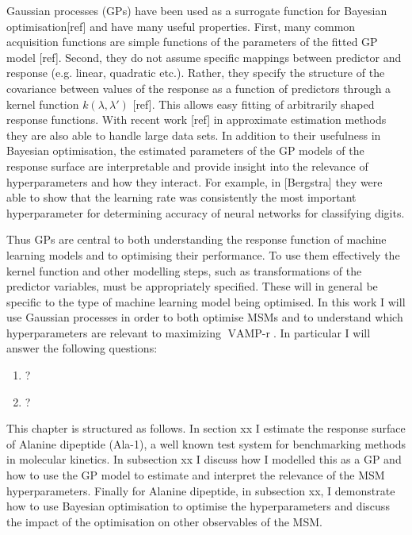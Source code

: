 Gaussian processes (GPs) have been used as a surrogate function for Bayesian optimisation[ref] and have many useful properties. First, many common acquisition functions are simple functions of the parameters of the fitted GP model [ref]. Second, they do not assume specific mappings between predictor and response (e.g. linear, quadratic etc.). Rather, they specify the structure of the covariance between values of the response as a function of predictors through a kernel function $k(\lambda, \lambda')$ [ref]. This allows easy fitting of arbitrarily shaped response functions.  With recent work [ref] in approximate estimation methods they are also able to handle large data sets. In addition to their usefulness in Bayesian optimisation, the estimated parameters of the GP models of the response surface are interpretable and provide insight into the relevance of hyperparameters and how they interact.  For example, in [Bergstra] they were able to show that the learning rate was consistently the most important hyperparameter for determining accuracy of neural networks for classifying digits. 


Thus GPs are central to both understanding the response function of machine learning models and to optimising their performance. To use them effectively the kernel function and other modelling steps, such as transformations of the predictor variables, must be appropriately specified. These will in general be specific to the type of machine learning model being optimised.  In this work  I will use Gaussian processes in order to both optimise MSMs and to understand which hyperparameters are relevant to maximizing $\operatorname{VAMP-r}$.  In particular I will answer the following questions: 

\begin{enumerate}
    \item ?
    \item ?
\end{enumerate}

This chapter is structured as follows. In section xx I estimate the response surface of Alanine dipeptide (Ala-1), a well known test system for benchmarking methods in molecular kinetics. In subsection xx I discuss how I modelled this as a GP and how to use the GP model to estimate and interpret the relevance of the MSM hyperparameters. Finally for Alanine dipeptide, in subsection xx, I demonstrate how to use Bayesian optimisation to optimise the hyperparameters and discuss the impact of the optimisation on other observables of the MSM. 

